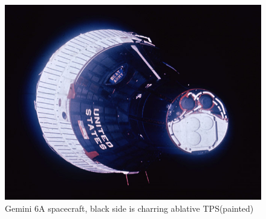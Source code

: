 \documentclass[12pt]{article}
\begin{document}
\begin{figure}[h!]
  \centering
  \includegraphics[width=0.8 \linewidth]{gemini_6.jpg}
  \caption{Gemini 6A spacecraft, black side is charring ablative TPS(painted)}
  \label{fig:gemini}
\end{figure}
\end{document}
